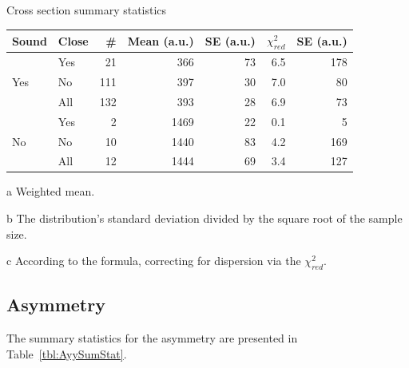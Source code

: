 \documentclass{report}
\begin{document}
\begin{threeparttable}
	\centering
	\caption{Cross section summary statistics\label{tbl:CS0SumStat}}
	\begin{tabular}{llrrrrr}
		\hline\hline
		Sound                & Close &  \# & Mean\tnote{a} (a.u.) & SE\tnote{b} (a.u.) & $\chi^2_{red}$ & SE\tnote{c} (a.u.) \\ \hline
		\multirow{3}{*}{Yes} & Yes   &  21 &                  366 &                 73 &            6.5 &                178 \\
		                     & No    & 111 &                  397 &                 30 &            7.0 &                 80 \\
		                     & All   & 132 &                  393 &                 28 &            6.9 &                 73 \\ \hline
		\multirow{3}{*}{No}  & Yes   &   2 &                 1469 &                 22 &            0.1 &                  5 \\
		                     & No    &  10 &                 1440 &                 83 &            4.2 &                169 \\
		                     & All   &  12 &                 1444 &                 69 &            3.4 &                127 \\ \hline
	\end{tabular}
	\begin{tablenotes}
		\item[a]{Weighted mean.}
		\item[b]{The distribution's standard deviation divided by the square root of the sample size.}
		\item[c]{According to the formula, correcting for dispersion via the $\chi^2_{red}$.}
	\end{tablenotes}
\end{threeparttable}

\subsection{Asymmetry}

The summary statistics for the asymmetry are presented in Table~\ref{tbl:AyySumStat}.
\end{document}
